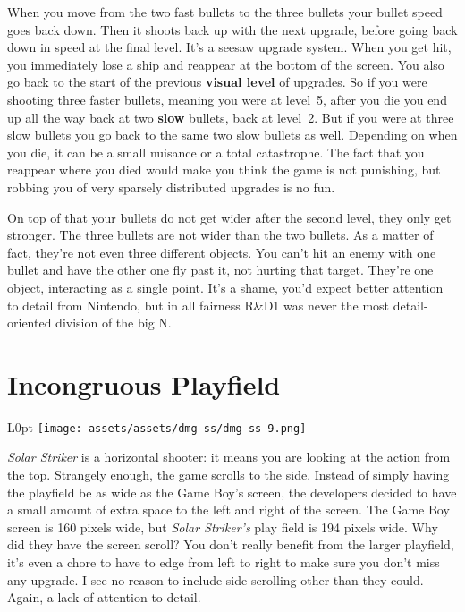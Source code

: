 \documentclass{book}
\let\oldcenter\center
\let\oldendcenter\endcenter
\renewenvironment{center}{\setlength\topsep{0pt}\oldcenter}{\oldendcenter}
\begin{document}
When you move from the two fast bullets to the three bullets your bullet speed goes back down. Then it shoots back up with the next upgrade, before going back down in speed at the final level. It’s a seesaw upgrade system. When you get hit, you immediately lose a ship and reappear at the bottom of the screen. You also go back to the start of the previous \textbf{visual level} of upgrades. So if you were shooting three faster bullets, meaning you were at level~5, after you die you end up all the way back at two \textbf{slow} bullets, back at level~2. But if you were at three slow bullets you go back to the same two slow bullets as well. Depending on when you die, it can be a small nuisance or a total catastrophe. The fact that you reappear where you died would make you think the game is not punishing, but robbing you of very sparsely distributed upgrades is no fun.

\begin{center}
\quad\vspace{4pt}
\quad\vspace{4pt}
\end{center}

On top of that your bullets do not get wider after the second level, they only get stronger. The three bullets are not wider than the two bullets. As a matter of fact, they’re not even three different objects. You can’t hit an enemy with one bullet and have the other one fly past it, not hurting that target. They’re one object, interacting as a single point. It’s a shame, you’d expect better attention to detail from Nintendo, but in all fairness R\&D1 was never the most detail-oriented division of the big N.

\FloatBarrier\needspace{10mm}\section*{Incongruous Playfield}\nopagebreak[4]

\begin{wrapfigure}{L}{0pt} \texttt{[image: assets/assets/dmg-ss/dmg-ss-9.png]}\end{wrapfigure}
\emph{Solar Striker} is a horizontal shooter: it means you are looking at the action from the top. Strangely enough, the game scrolls to the side. Instead of simply having the playfield be as wide as the Game Boy’s screen, the developers decided to have a small amount of extra space to the left and right of the screen. The Game Boy screen is 160 pixels wide, but \emph{Solar Striker’s} play field is 194 pixels wide. Why did they have the screen scroll? You don’t really benefit from the larger playfield, it’s even a chore to have to edge from left to right to make sure you don’t miss any upgrade. I see no reason to include side-scrolling other than they could. Again, a lack of attention to detail.
\end{document}
